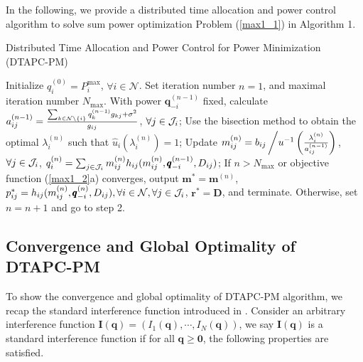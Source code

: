 \documentclass[journal]{IEEEtran}
\begin{document}
In the following, we provide a distributed time allocation and power control  algorithm to solve sum power optimization Problem (\ref{max1_1}) in Algorithm 1.
\begin{algorithm}[h]
\caption{Distributed Time Allocation and Power Control for Power Minimization (DTAPC-PM)}
\label{alg:Framwork1}
\begin{algorithmic}[1]
\State Initialize $q_i^{(0)}=P_i^{\max}$, $\forall i \in \mathcal N$.
Set iteration number $n=1$, and maximal iteration number $N_{\max}$.
\State With power $\pmb q_{-i}^{(n-1)}$ fixed, calculate $a_{ij}^{(n-1)}=\frac{\sum_{k \in {\cal{N}}\setminus \{i\}}  q_k^{(n-1)} g_{kj} +\sigma ^2} {g_{ij}}$, $\forall j \in {\cal{J}}_i$;
\State Use the bisection method to obtain the optimal $\lambda_i^{(n)}$ such that $\hat u_i(\lambda_i ^{(n)})=1$;
\State Update $m_{ij}^{(n)}={b_{ij}} \left/{ u^{-1} \left(\frac { \lambda_i^{(n)}} {a_{ij}^{(n-1)}} \right)}\right.$, $\forall j \in {\cal{J}}_i$,
$q_{i}^{(n)} =\sum_{j \in {\cal{J}}_i }
m_{ij}^{(n)} h_{ij}(m_{ij}^{(n)},\pmb{q}^{(n-1)}_{-i}, D_{ij})$;
\EndFor
\State  %
If $n > N_{\max}$ or objective function (\ref{max1_2}a) converges,
output $\pmb m^*=\pmb m^{(n)}$, $p_{ij}^*=h_{ij}(m_{ij}^{(n)},\pmb{q}_{-i}^{(n)}, D_{ij}), \forall i  \in {\cal{N}}, \forall j \in {\cal{J}}_i$, $\pmb r^*=\pmb D$, and
terminate.
Otherwise, set $n=n+1$ and go to step 2.
\end{algorithmic}
\end{algorithm}

\subsection{Convergence and Global Optimality of DTAPC-PM}
To show the convergence and global optimality of DTAPC-PM algorithm,
we recap the standard interference function introduced in \cite{yates1995framework}.
Consider an arbitrary interference function $\pmb{I}(\pmb{q})=(I_1(\pmb{q}), \cdots, I_N(\pmb{q}))$, we say $\pmb{I}(\pmb{q})$ is a standard interference function if for all $\pmb{q} \geq \pmb{0}$, the following properties are satisfied.
\end{document}
